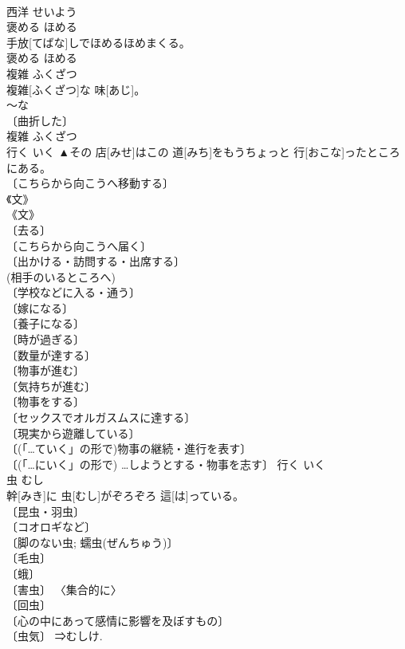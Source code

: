 \documentclass[8pt]{extreport}
\begin{document}
\begin{CJK}{UTF8}{min}
\\	西洋	せいよう	
\\	褒める	ほめる	
\\	手放[てばな]しでほめるほめまくる。	
\\	褒める	ほめる	
\\	複雑	ふくざつ	
\\	複雑[ふくざつ]な 味[あじ]。	
\\	～な 
\\	〔曲折した〕 
\\	複雑	ふくざつ	
\\	行く	いく	▲その 店[みせ]はこの 道[みち]をもうちょっと 行[おこな]ったところにある。	
\\	〔こちらから向こうへ移動する〕 
\\	《文》 
\\	《文》 
\\	〔去る〕 
\\	〔こちらから向こうへ届く〕 
\\	〔出かける・訪問する・出席する〕 
\\	(相手のいるところへ) 
\\	〔学校などに入る・通う〕 
\\	〔嫁になる〕 
\\	〔養子になる〕 
\\	〔時が過ぎる〕 
\\	〔数量が達する〕 
\\	〔物事が進む〕 
\\	〔気持ちが進む〕 
\\	〔物事をする〕 
\\	〔セックスでオルガスムスに達する〕 
\\	〔現実から遊離している〕 
\\	〔(「…ていく」の形で)物事の継続・進行を表す〕 
\\	〔(「…にいく」の形で) …しようとする・物事を志す〕	行く	いく	
\\	虫	むし	
\\	幹[みき]に 虫[むし]がぞろぞろ 這[は]っている。	
\\	〔昆虫・羽虫〕 
\\	〔コオロギなど〕 
\\	〔脚のない虫; 蠕虫(ぜんちゅう)〕 
\\	〔毛虫〕 
\\	〔蛾〕 
\\	〔害虫〕 〈集合的に〉 
\\	〔回虫〕 
\\	〔心の中にあって感情に影響を及ぼすもの〕 
\\	〔虫気〕 ⇒むしけ. 

\end{CJK}
\end{document}
